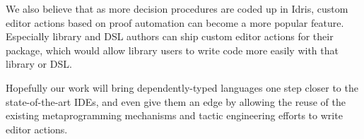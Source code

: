 We also believe that as more decision procedures are coded up in Idris,
custom editor actions based on proof automation can become a more popular
feature. Especially library and DSL authors can ship custom editor actions for
their package, which would allow library users to write code more easily with
that library or DSL.

Hopefully our work will bring dependently-typed languages one step closer to the
state-of-the-art IDEs, and even give them an edge by allowing the reuse of the
existing metaprogramming mechanisms and tactic engineering efforts to write
editor actions.

